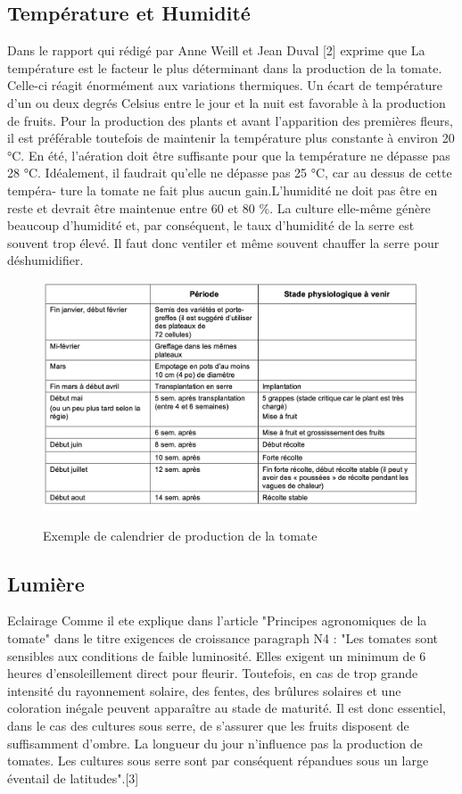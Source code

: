 \subsection{Température et Humidité}
Dans le rapport qui rédigé par Anne Weill et Jean Duval [2] exprime que 
La température est le facteur le plus déterminant dans la production de la tomate. Celle-ci
réagit énormément aux variations thermiques.
Un écart de température d’un ou deux degrés Celsius entre le jour et la nuit est favorable à
la production de fruits. Pour la production des plants et avant l’apparition des premières
fleurs, il est préférable toutefois de maintenir la température plus constante à environ
20 °C. En été, l’aération doit être suffisante pour que la température ne dépasse pas 28
°C. Idéalement, il faudrait qu’elle ne dépasse pas 25 °C, car au dessus de cette tempéra-
ture la tomate ne fait plus aucun gain.L’humidité ne doit pas être en reste et devrait être
maintenue entre 60 et 80 \%. La culture elle-même génère beaucoup d’humidité et, par
conséquent, le taux d’humidité de la serre est souvent trop élevé. Il faut donc ventiler et
même souvent chauffer la serre pour déshumidifier.
\begin{figure}
    \centering
    \centering
    \caption{Exemple de calendrier de production de la tomate}
	\includegraphics[width=15cm]{figures/periodetomate.png}
	\label{fig:Exemple de calendrier de production de la tomate} 
\end{figure}

\subsection{Lumière}
Eclairage
Comme il ete explique dans l’article "Principes agronomiques de la tomate" dans le titre
exigences de croissance paragraph N4 : "Les tomates sont sensibles aux conditions de
faible luminosité. Elles exigent un minimum de 6 heures d’ensoleillement direct pour
fleurir. Toutefois, en cas de trop grande intensité du rayonnement solaire, des fentes, des
brûlures solaires et une coloration inégale peuvent apparaître au stade de maturité. Il est
donc essentiel, dans le cas des cultures sous serre, de s’assurer que les fruits disposent de
suffisamment d’ombre. La longueur du jour n’influence pas la production de tomates. Les
cultures sous serre sont par conséquent répandues sous un large éventail de latitudes".[3]
